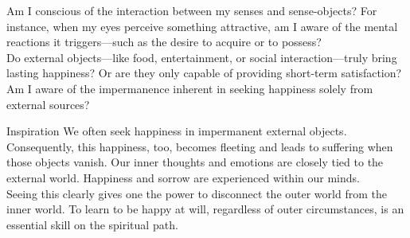 \newpage
\begin{mananam}{} 
\mananamtext Am I conscious of the interaction between my senses and sense-objects? For instance, when my eyes perceive something attractive, am I aware of the mental reactions it triggers—such as the desire to acquire or to possess?\\
Do external objects—like food, entertainment, or social interaction—truly bring lasting happiness? Or are they only capable of providing short-term satisfaction? Am I aware of the impermanence inherent in seeking happiness solely from external sources?
\end{mananam}
\WritingHand{}
\begin{inspiration}{\mananamfont Inspiration}
\mananamtext We often seek happiness in impermanent external objects. Consequently, this happiness, too, becomes fleeting and leads to suffering when those objects vanish. Our inner thoughts and emotions are closely tied to the external world. Happiness and sorrow are experienced within our minds.\\
Seeing this clearly gives one the power to disconnect the outer world from the inner world. To learn to be happy at will, regardless of outer circumstances, is an essential skill on the spiritual path.
\end{inspiration}
\newpage





